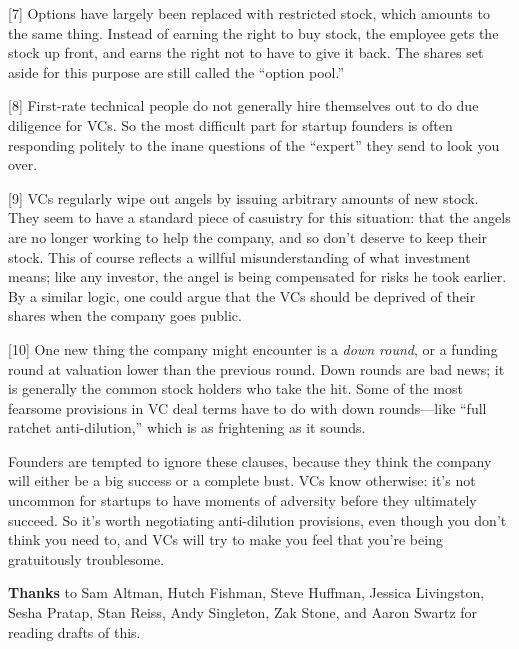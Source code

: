 {[}7{]} Options have largely been replaced with restricted stock, which
amounts to the same thing. Instead of earning the right to buy stock,
the employee gets the stock up front, and earns the right not to have to
give it back. The shares set aside for this purpose are still called the
``option pool.''

{[}8{]} First-rate technical people do not generally hire themselves out
to do due diligence for VCs. So the most difficult part for startup
founders is often responding politely to the inane questions of the
``expert'' they send to look you over.

{[}9{]} VCs regularly wipe out angels by issuing arbitrary amounts of
new stock. They seem to have a standard piece of casuistry for this
situation: that the angels are no longer working to help the company,
and so don't deserve to keep their stock. This of course reflects a
willful misunderstanding of what investment means; like any investor,
the angel is being compensated for risks he took earlier. By a similar
logic, one could argue that the VCs should be deprived of their shares
when the company goes public.

{[}10{]} One new thing the company might encounter is a \emph{down
round}, or a funding round at valuation lower than the previous round.
Down rounds are bad news; it is generally the common stock holders who
take the hit. Some of the most fearsome provisions in VC deal terms have
to do with down rounds---like ``full ratchet anti-dilution,'' which is
as frightening as it sounds.

Founders are tempted to ignore these clauses, because they think the
company will either be a big success or a complete bust. VCs know
otherwise: it's not uncommon for startups to have moments of adversity
before they ultimately succeed. So it's worth negotiating anti-dilution
provisions, even though you don't think you need to, and VCs will try to
make you feel that you're being gratuitously troublesome.

\textbf{Thanks} to Sam Altman, Hutch Fishman, Steve Huffman, Jessica
Livingston, Sesha Pratap, Stan Reiss, Andy Singleton, Zak Stone, and
Aaron Swartz for reading drafts of this.
